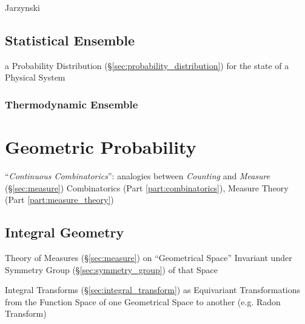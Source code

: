 Jarzynski



\subsection{Statistical Ensemble}\label{sec:statistical_ensemble}

a Probability Distribution (\S\ref{sec:probability_distribution}) for the state
of a Physical System



\subsubsection{Thermodynamic Ensemble}\label{sec:thermodynamic_ensemble}



\section{Geometric Probability}\label{sec:geometric_probability}

``\emph{Continuous Combinatorics}'': analogies between \emph{Counting} and
\emph{Measure} (\S\ref{sec:measure}) \fist Combinatorics (Part
\ref{part:combinatorics}), Measure Theory (Part \ref{part:measure_theory})



\subsection{Integral Geometry}\label{sec:integral_geometry}

Theory of Measures (\S\ref{sec:measure}) on ``Geometrical Space'' Invariant
under Symmetry Group (\S\ref{sec:symmetry_group}) of that Space

Integral Transforms (\S\ref{sec:integral_transform}) as Equivariant
Transformations from the Function Space of one Geometrical Space to another
(e.g. Radon Transform)



